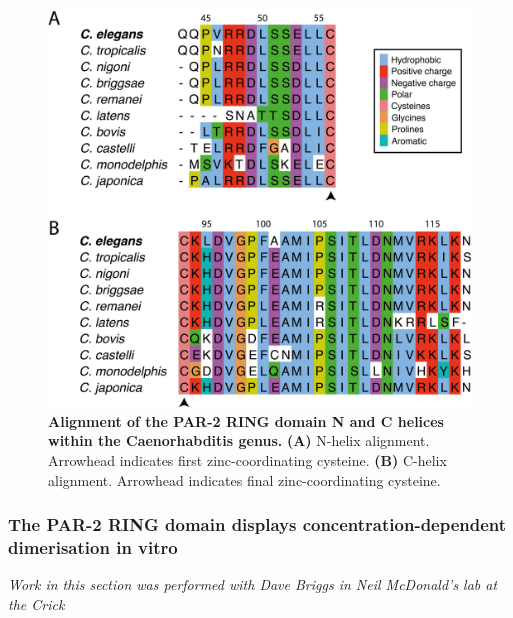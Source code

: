 \documentclass[12pt]{"article"}
\newcommand{\mycaption}[2]{\caption[#1]{\textbf{#1.} #2}}
\begin{document}
\begin{figure}
\includegraphics[scale=1]{alignments_par2}
\centering
\mycaption{Alignment of the PAR-2 RING domain N and C helices within the Caenorhabditis genus}{
\textbf{(A)} N-helix alignment. Arrowhead indicates first zinc-coordinating cysteine.
\textbf{(B)} C-helix alignment. Arrowhead indicates final zinc-coordinating cysteine.
}
\label{fig:alignments_par2}
\end{figure}



\subsubsection{The PAR-2 RING domain displays concentration-dependent dimerisation in vitro}

\textit{Work in this section was performed with Dave Briggs in Neil McDonald's lab at the Crick}\\


\end{document}
